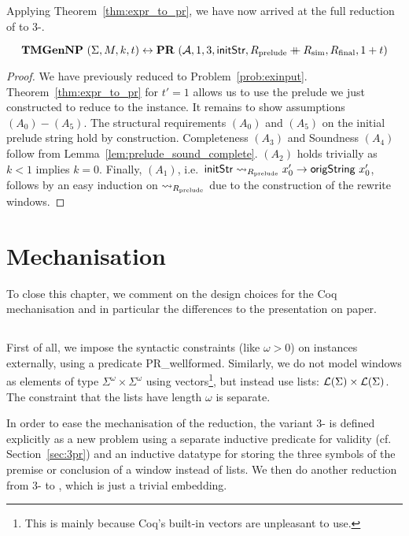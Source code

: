 Applying Theorem~\ref{thm:expr_to_pr}, we have now arrived at the full reduction of \gennp{} to 3-\PR{}.

\begin{theorem}
  \[\textbf{TMGenNP}~(\Sigma, M, k, t) \leftrightarrow \textbf{PR}~(\mathcal{A}, 1, 3, \textsf{initStr}, R_{\text{prelude}} \mathbin{+\mkern-10mu+} R_{\text{sim}}, R_{\text{final}}, 1 + t) \]
\end{theorem}
\begin{proof}
  We have previously reduced \gennp{} to Problem~\ref{prob:exinput}. Theorem~\ref{thm:expr_to_pr} for $t' = 1$ allows us to use the prelude we just constructed to reduce to the \PR{} instance.
  It remains to show assumptions $(A_0) - (A_5)$. 
  The structural requirements $(A_0)$ and $(A_5)$ on the initial prelude string hold by construction. 
  Completeness $(A_3)$ and Soundness $(A_4)$ follow from Lemma~\ref{lem:prelude_sound_complete}. 
  $(A_2)$ holds trivially as $k < 1$ implies $k = 0$. Finally, $(A_1)$, i.e.\ $\textsf{initStr} \rightsquigarrow_{R_{\text{prelude}}} x_0' \rightarrow \textsf{origString}~x_0'$, follows by an easy induction on $\rightsquigarrow_{R_{\text{prelude}}}$ due to the construction of the rewrite windows. 
\end{proof}

\section{Mechanisation}
To close this chapter, we comment on the design choices for the Coq mechanisation and in particular the differences to the presentation on paper. 

\subsection{\PR{}}
First of all, we impose the syntactic constraints (like $\omega > 0$) on \PR{} instances externally, using a predicate \textsf{PR\_wellformed}. 
Similarly, we do not model windows as elements of type $\Sigma^\omega \times \Sigma^\omega$ using vectors\footnote{This is mainly because Coq's built-in vectors are unpleasant to use.}, but instead use lists: $\mathcal{L} (\Sigma) \times \mathcal{L} (\Sigma)$. The constraint that the lists have length $\omega$ is separate.

In order to ease the mechanisation of the reduction, the variant 3-\PR{} is defined explicitly as a new problem using a separate inductive predicate for validity (cf. Section~\ref{sec:3pr}) and an inductive datatype for storing the three symbols of the premise or conclusion of a window instead of lists.
We then do another reduction from 3-\PR{} to \PR{}, which is just a trivial embedding.

